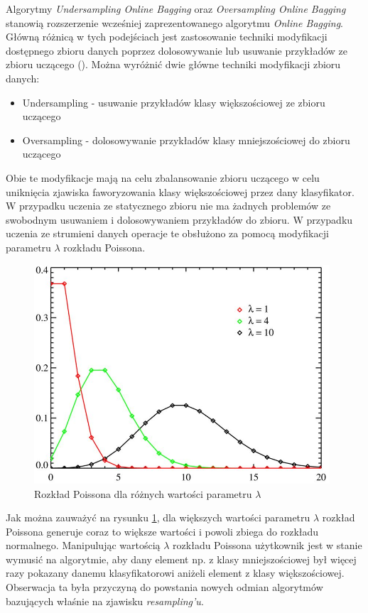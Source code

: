 \noindent Algorytmy \textit{Undersampling Online Bagging} oraz \textit{Oversampling Online Bagging} stanowią rozszerzenie wcześniej zaprezentowanego algorytmu \textit{Online Bagging}. Główną różnicą w tych podejściach jest zastosowanie techniki modyfikacji dostępnego zbioru danych poprzez dolosowywanie lub usuwanie przykładów ze zbioru uczącego (). Można wyróżnić dwie główne techniki modyfikacji zbioru danych:

\begin{itemize}
    \item Undersampling - usuwanie przykładów klasy większościowej ze zbioru uczącego
    \item Oversampling - dolosowywanie przykładów klasy mniejszościowej do zbioru uczącego
\end{itemize}

\noindent Obie te modyfikacje mają na celu zbalansowanie zbioru uczącego w celu uniknięcia zjawiska faworyzowania klasy większościowej przez dany klasyfikator. W przypadku uczenia ze statycznego zbioru nie ma żadnych problemów ze swobodnym usuwaniem i dolosowywaniem przykładów do zbioru. W przypadku uczenia ze strumieni danych operacje te obsłużono za pomocą modyfikacji parametru $\lambda$ rozkładu Poissona.

\begin{figure}[h] 
    \centering
    \includegraphics[width=11cm]{figures/poisson.JPG}
    \caption{Rozkład Poissona dla różnych wartości parametru $\lambda$}\label{Figure:Poisson}
\end{figure}

\noindent Jak można zauważyć na rysunku \ref{Figure:Poisson}, dla większych wartości parametru $\lambda$ rozkład Poissona generuje coraz to większe wartości i powoli zbiega do rozkładu normalnego. Manipulując wartością $\lambda$ rozkładu Poissona użytkownik jest w stanie wymusić na algorytmie, aby dany element np. z klasy mniejszościowej był więcej razy pokazany danemu klasyfikatorowi aniżeli element z klasy większościowej. Obserwacja ta była przyczyną do powstania nowych odmian algorytmów bazujących właśnie na zjawisku \textit{resampling'u}.

